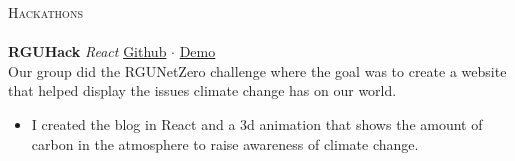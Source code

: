 \documentclass[a4paper]{article}
\newcommand{\lineunder} {
    \vspace*{-8pt} \\
    \hspace*{-18pt} \hrulefill \\
}
\newcommand{\header} [1] {
    {\hspace*{-18pt}\vspace*{6pt} \textsc{#1}}
    \vspace*{-6pt} \lineunder
}
\begin{document}
\header{Hackathons}
\textbf{RGUHack} {\sl React} \hfill  \href{https://github.com/Kelbie/rgu-hack-climate-website}{Github} $\cdot$ \href{https://www.youtube.com/watch?v=3jv-3uo-xhk}{Demo}\\
Our group did the RGUNetZero challenge where the goal was to create a website that helped display the issues climate change has on our world.\
\begin{itemize} \itemsep 1pt
	\item I created the blog in React and a 3d animation that shows the amount of carbon in the atmosphere to raise awareness of climate change.
\end{itemize}
\vspace*{2mm}
\end{document}
